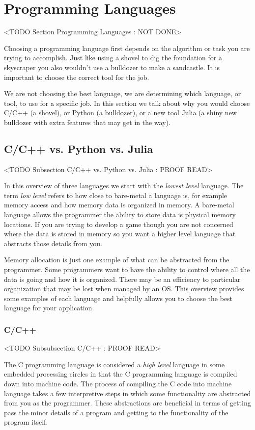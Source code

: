\section{Programming Languages}
	<TODO Section Programming Languages : NOT DONE>

Choosing a programming language first depends on the algorithm or task you are trying to accomplish. Just like using a shovel to dig the foundation for a skyscraper you also wouldn't use a bulldozer to make a sandcastle. It is important to choose the correct tool for the job. 	
	
We are not choosing the best language, we are determining which language, or tool, to use for a specific job. In this section we talk about why you would choose C/C++ (a shovel), or Python (a bulldozer), or a new tool Julia (a shiny new bulldozer with extra features that may get in the way). 	
	
	
\subsection{C/C++ vs. Python vs. Julia}
	<TODO Subsection C/C++ vs. Python vs. Julia : PROOF READ>

In this overview of three languages we start with the \emph{lowest level} language. The term \emph{low level} refers to how close to bare-metal a language is, for example memory access and how memory data is organized in memory. A bare-metal language allows the programmer the ability to store data is physical memory locations. If you are trying to develop a game though you are not concerned where the data is stored in memory so you want a higher level language that abstracts those details from you. 

Memory allocation is just one example of what can be abstracted from the programmer. Some programmers want to have the ability to control where all the data is going and how it is organized. There may be an efficiency to particular organization that may be lost when managed by an \ac{OS}. This overview provides some examples of each language and helpfully allows you to choose the best language for your application.

\subsubsection{C/C++}
	<TODO Subsubsection  C/C++ : PROOF READ>

The C programming language is considered a \emph{high level} language in some embedded processing circles in that the C programming language is compiled down into machine code. The process of compiling the C code into machine language takes a few interpretive steps in which some functionality are abstracted from you as the programmer. These abstractions are beneficial in terms of getting pass the minor details of a program and getting to the functionality of the program itself. 

